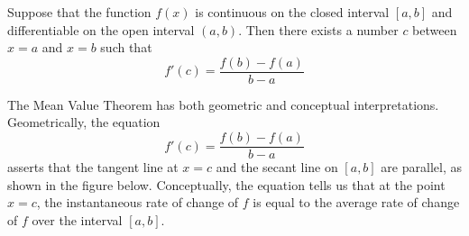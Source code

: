 \documentclass[handout]{ximera}
\begin{document}
\begin{theorem}
Suppose that the function $f(x)$ is continuous on the closed interval $[a,b]$ and differentiable on the 
open interval $(a,b)$. Then there exists a number $c$ between $x = a$ and $x = b$ such that
\[f'(c) = \frac{f(b) - f(a)}{b-a}\]

\end{theorem}




The Mean Value Theorem has both geometric and conceptual interpretations.
Geometrically, the equation
\[
f'(c) = \frac{f(b) -f(a)}{b-a}
\]
asserts that the tangent line at $x = c$ and the secant line on $[a,b]$ are parallel, as shown in the figure below.
Conceptually, the equation tells us that at the point $x=c$, the instantaneous rate of change of $f$ 
is equal to the average rate of change of $f$ over the interval $[a,b]$.


\end{document}

